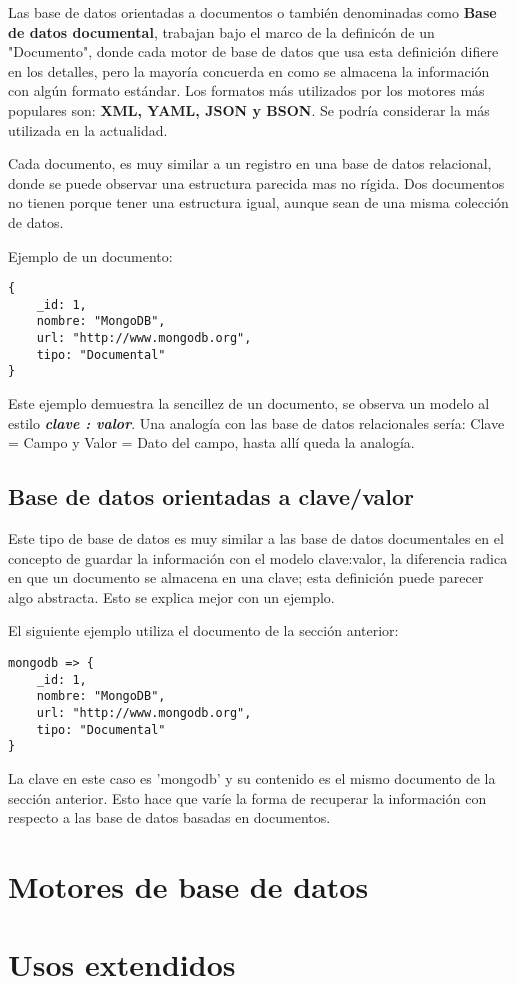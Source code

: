 Las base de datos orientadas a documentos o tambi\'en denominadas como {\bf Base de datos documental}, trabajan bajo el marco de la definic\'on de un "Documento", donde cada motor de base de datos que usa esta definici\'on difiere en los detalles, pero la mayor\'ia concuerda en como se almacena la informaci\'on con alg\'un formato est\'andar. Los formatos m\'as utilizados por los motores m\'as populares son: {\bf XML, YAML, JSON y BSON}. Se podr\'ia considerar la m\'as utilizada en la actualidad.

Cada documento, es muy similar a un registro en una base de datos relacional, donde se puede observar una estructura parecida mas no r\'igida. Dos documentos no tienen porque tener una estructura igual, aunque sean de una misma colecci\'on de datos.

Ejemplo de un documento:

\begin{lstlisting}
{
	_id: 1,
	nombre: "MongoDB",
	url: "http://www.mongodb.org",
	tipo: "Documental"
}
\end{lstlisting}

Este ejemplo demuestra la sencillez de un documento, se observa un modelo al estilo \textit{\textbf{clave : valor}}. Una analog\'ia con las base de datos relacionales ser\'ia: Clave = Campo y Valor = Dato del campo, hasta all\'i queda la analog\'ia.

\subsection{Base de datos orientadas a clave/valor}

Este tipo de base de datos es muy similar a las base de datos documentales en el concepto de guardar la informaci\'on con el modelo clave:valor, la diferencia radica en que un documento se almacena en una clave; esta definici\'on puede parecer algo abstracta. Esto se explica mejor con un ejemplo.

El siguiente ejemplo utiliza el documento de la secci\'on anterior:

\begin{lstlisting}
mongodb => {
	_id: 1,
	nombre: "MongoDB",
	url: "http://www.mongodb.org",
	tipo: "Documental"
}
\end{lstlisting}

La clave en este caso es 'mongodb' y su contenido es el mismo documento de la secci\'on anterior. Esto hace que var\'ie la forma de recuperar la informaci\'on con respecto a las base de datos basadas en documentos.

\section{Motores de base de datos}

\section{Usos extendidos}

